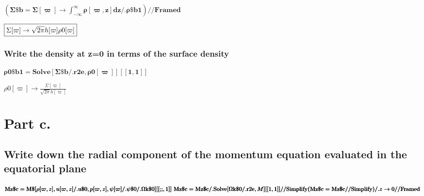 \documentclass{article}
\begin{document}
\begin{doublespace}
\noindent\(\pmb{\left(\text{$\Sigma \$$b} = \Sigma [\varpi ]\to  \int _{-\infty }^{\infty }\rho [\varpi ,z] dz\text{/.}\text{$\rho \$$b1}\right)
\text{//}\text{Framed}}\)
\end{doublespace}

\begin{doublespace}
\noindent\(\fbox{$\Sigma [\varpi ]\to \sqrt{2 \pi } h[\varpi ] \text{$\rho $0}[\varpi ]$}\)
\end{doublespace}

\subsubsection*{Write the density at z=0 in terms of the surface density}

\begin{doublespace}
\noindent\(\pmb{\text{$\rho $0$\$$b1} = \text{Solve}[\text{$\Sigma \$$b} \text{/.} \text{r2e}, \text{$\rho $0}[\varpi ]][[1,1]]}\)
\end{doublespace}

\begin{doublespace}
\noindent\(\text{$\rho $0}[\varpi ]\to \frac{\Sigma [\varpi ]}{\sqrt{2 \pi } h[\varpi ]}\)
\end{doublespace}

\section*{Part c.}

\subsection*{Write down the radial component of the momentum equation evaluated in the equatorial plane}

\begin{doublespace}
\noindent\(\pmb{\text{Mz$\$$c} = \text{M$\$$}[\rho [\varpi ,z],u[\varpi ,z]\text{/.}\text{u$\$$0} ,p[\varpi ,z],\psi [\varpi ]\text{/.}\text{$\psi
\$$0}\text{/.}\text{$\Omega $k$\$$0}] [[\text{;;},1]]\text{  }}\\
\pmb{\text{Mz$\$$c} = \text{Mz$\$$c} \text{/.} \text{Solve}[\text{$\Omega $k$\$$0}\text{/.} \text{r2e}, M][[1,1]]\text{//}\text{Simplify}}\\
\pmb{(\text{Mz$\$$c} = \text{Mz$\$$c}\text{//}\text{Simplify}) \text{/.} z\to  0\text{//}\text{Framed}}\)
\end{doublespace}
\end{document}
